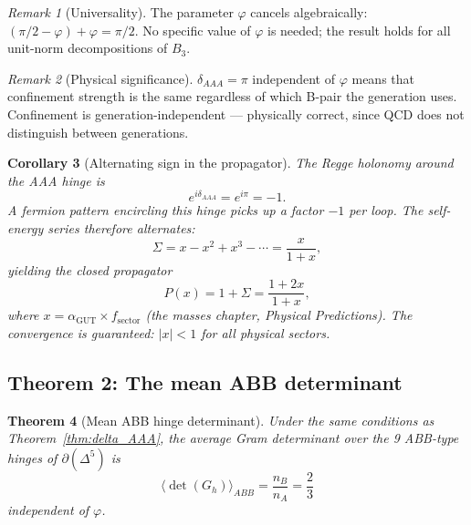 \documentclass[12pt]{article}
\newtheorem{theorem}{Theorem}[section]
\newtheorem{corollary}[theorem]{Corollary}
\theoremstyle{remark}
\newtheorem{remark}[theorem]{Remark}
\theoremstyle{definition}
\newcommand{\agut}{\alpha_{\mathrm{GUT}}}
\begin{document}
\begin{remark}[Universality]
The parameter $\varphi$ cancels algebraically: $(\pi/2 - \varphi) + \varphi = \pi/2$.  No specific value of $\varphi$ is needed; the result holds for all unit-norm decompositions of $B_3$.
\end{remark}

\begin{remark}[Physical significance]
$\delta_{AAA} = \pi$ independent of $\varphi$ means that confinement strength is the same regardless of which B-pair the generation uses.  Confinement is generation-independent --- physically correct, since QCD does not distinguish between generations.
\end{remark}

\begin{corollary}[Alternating sign in the propagator]
\label{cor:alternating}
The Regge holonomy around the AAA hinge is
\begin{equation}
e^{i\delta_{AAA}} = e^{i\pi} = -1.
\end{equation}
A fermion pattern encircling this hinge picks up a factor $-1$ per
loop.  The self-energy series therefore alternates:
\begin{equation}
\Sigma = x - x^2 + x^3 - \cdots = \frac{x}{1+x},
\end{equation}
yielding the closed propagator
\begin{equation}
P(x) = 1 + \Sigma = \frac{1 + 2x}{1 + x},
\end{equation}
where $x = \agut \times f_{\text{sector}}$ (the masses chapter, \textit{Physical Predictions}).
The convergence is guaranteed: $|x| < 1$ for all physical sectors.
\end{corollary}

\subsection{Theorem 2: The mean ABB determinant}
\label{sec:thm_ABB}

\begin{theorem}[Mean ABB hinge determinant]\label{thm:det_ABB}
Under the same conditions as Theorem~\ref{thm:delta_AAA},
the average Gram determinant over the 9 ABB-type hinges of
$\partial(\Delta^5)$ is
\begin{equation}
\boxed{\bigl\langle \det(G_h) \bigr\rangle_{ABB} = \frac{n_B}{n_A}
= \frac{2}{3}}
\end{equation}
independent of $\varphi$.
\end{theorem}
\end{document}
